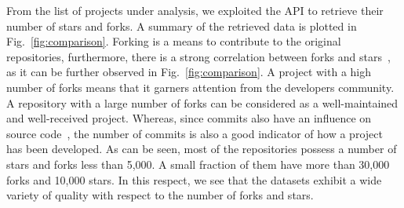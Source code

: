 From the list of projects under analysis, we exploited the \GH API to retrieve 
their number of stars and forks. A summary of the retrieved data is plotted in 
Fig.~\ref{fig:comparison}. %
Forking is a means to contribute to the original repositories, %
furthermore, there is a strong correlation between forks and stars~\cite{7816479}, as it can be further observed in Fig.~\ref{fig:comparison}. A project with a high number of forks means that it garners attention from the developers community. A repository with a large number of forks can be considered as a well-maintained and well-received project. Whereas, since commits also have an influence on source code~\cite{8009930}, the number of commits is also a good indicator of how a project has been developed. As can be seen, most of the repositories possess a number of stars and forks less than 5,000. A small fraction of them have more than 30,000 forks and 10,000 stars. In this respect, we see that the datasets exhibit a wide variety of quality with respect to the number of forks and stars.










